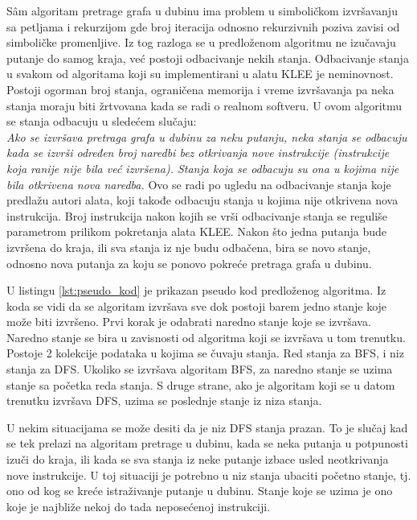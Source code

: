 \documentclass[12pt,oneside]{memoir}
\begin{document}
S\^am algoritam pretrage grafa u dubinu ima problem u simboličkom izvršavanju sa petljama i rekurzijom gde broj iteracija odnosno rekurzivnih poziva zavisi od simboličke promenljive. Iz tog razloga se u predloženom algoritmu ne izučavaju putanje do samog kraja, već postoji odbacivanje nekih stanja. Odbacivanje stanja u svakom od algoritama koji su implementirani u alatu KLEE je neminovnost. Postoji ogorman broj stanja, ograničena memorija i vreme izvršavanja pa neka stanja moraju biti žrtvovana kada se radi o realnom softveru. U ovom algoritmu se stanja odbacuju u sledećem slučaju: \\
\textit{Ako se izvršava pretraga grafa u dubinu za neku putanju, neka stanja se odbacuju kada se izvrši određen broj naredbi bez otkrivanja nove instrukcije (instrukcije koja ranije nije bila već izvršena). Stanja koja se odbacuju su ona u kojima nije bila otkrivena nova naredba.}
Ovo se radi po ugledu na odbacivanje stanja koje predlažu autori alata, koji takođe odbacuju stanja u kojima nije otkrivena nova instrukcija. Broj instrukcija nakon kojih se vrši odbacivanje stanja se reguliše parametrom prilikom pokretanja alata KLEE. Nakon što jedna putanja bude izvršena do kraja, ili sva stanja iz nje budu odbačena, bira se novo stanje, odnosno nova putanja za koju se ponovo pokreće pretraga grafa u dubinu.

U listingu \ref{lst:pseudo_kod} je prikazan pseudo kod predloženog algoritma. Iz koda se vidi da se algoritam izvršava sve dok postoji barem jedno stanje koje može biti izvršeno. Prvi korak je odabrati naredno stanje koje se izvršava. Naredno stanje se bira u zavisnosti od algoritma koji se izvršava u tom trenutku. Postoje 2 kolekcije podataka u kojima se čuvaju stanja. Red stanja za BFS, i niz stanja za DFS. Ukoliko se izvršava algoritam BFS, za naredno stanje se uzima stanje sa početka reda stanja. S druge strane, ako je algoritam koji se u datom trenutku izvršava DFS, uzima se poslednje stanje iz niza stanja. 

U nekim situacijama se može desiti da je niz DFS stanja prazan. To je slučaj kad se tek prelazi na algoritam pretrage u dubinu, kada se neka putanja u potpunosti izuči do kraja, ili kada se sva stanja iz neke putanje izbace usled neotkrivanja nove instrukcije. U toj situaciji je potrebno u niz stanja ubaciti početno stanje, tj. ono od kog se kreće istraživanje putanje u dubinu. Stanje koje se uzima je ono koje je najbliže nekoj do tada neposećenoj instrukciji.
\end{document}
